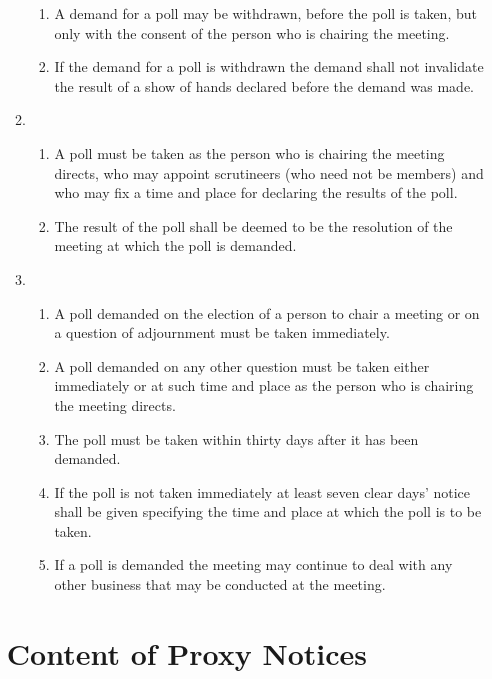 \begin{enumerate}
\begin{enumerate}
    \begin{enumerate}
    \item
      A demand for a poll may be withdrawn, before the poll is taken, but
      only with the consent of the person who is chairing the meeting.
    \item
      If the demand for a poll is withdrawn the demand shall not
      invalidate the result of a show of hands declared before the demand
      was made.
    \end{enumerate}
  \item
    

    \begin{enumerate}
    \item
      A poll must be taken as the person who is chairing the meeting
      directs, who may appoint scrutineers (who need not be members) and
      who may fix a time and place for declaring the results of the poll.
    \item
      The result of the poll shall be deemed to be the resolution of the
      meeting at which the poll is demanded.
    \end{enumerate}
  \item
    

    \begin{enumerate}
    \item
      A poll demanded on the election of a person to chair a meeting or
      on a question of adjournment must be taken immediately.
    \item
      A poll demanded on any other question must be taken either
      immediately or at such time and place as the person who is chairing
      the meeting directs.
    \item
      The poll must be taken within thirty days after it has been
      demanded.
    \item
      If the poll is not taken immediately at least seven clear days'
      notice shall be given specifying the time and place at which the
      poll is to be taken.
    \item
      If a poll is demanded the meeting may continue to deal with any
      other business that may be conducted at the meeting.
    \end{enumerate}
  \end{enumerate}

\section{Content of Proxy Notices}


\end{enumerate}
